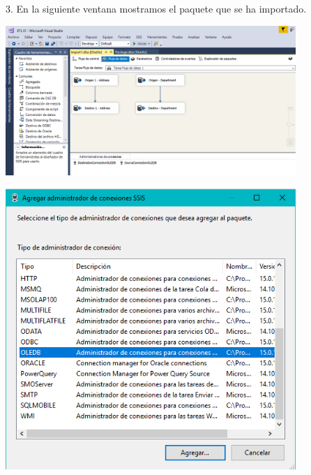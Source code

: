 3. En la siguiente ventana mostramos el paquete que se ha importado.\\
	\begin{center}
	\includegraphics[width=11cm]{./Imagenes/img17}
	\end{center}	
	\begin{center}
	\includegraphics[width=11cm]{./Imagenes/img18}
	\end{center}	


